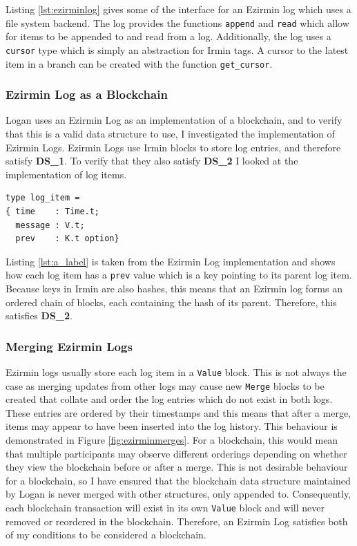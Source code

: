 \documentclass[12pt,a4paper,twoside,openright]{report}
\begin{document}
	Listing \ref{lst:ezirminlog} gives some of the interface for an Ezirmin log which uses a file system backend.
	The log provides the functions \texttt{append} and \texttt{read} which allow for items to be appended to and read from a log.
	Additionally, the log uses a \texttt{cursor} type which is simply an abstraction for Irmin tags.
	A cursor to the latest item in a branch can be created with the function \texttt{get\_cursor}.

	\subsubsection*{Ezirmin Log as a Blockchain}
	Logan uses an Ezirmin Log as an implementation of a blockchain, and to verify that this is a valid data structure to use, I investigated the implementation of Ezirmin Logs.
	Ezirmin Logs use Irmin blocks to store log entries, and therefore satisfy \textbf{DS\_1}. 
	To verify that they also satisfy \textbf{DS\_2} I looked at the implementation of log items.\\

	\begin{lstlisting}[caption={Ezirmin Log Item},label={lst:a_label}]
type log_item =
{ time    : Time.t;
  message : V.t;
  prev    : K.t option}
	\end{lstlisting}

	Listing \ref{lst:a_label} is taken from the Ezirmin Log implementation and shows how each log item has a \texttt{prev} value which is a key pointing to its parent log item. 
	Because keys in Irmin are also hashes, this means that an Ezirmin log forms an ordered chain of blocks, each containing the hash of its parent. 
	Therefore, this satisfies \textbf{DS\_2}.

	\subsubsection*{Merging Ezirmin Logs}
	Ezirmin logs usually store each log item in a \texttt{Value} block.
	This is not always the case as merging updates from other logs may cause new \texttt{Merge} blocks to be created that collate and order the log entries which do not exist in both logs.
	These entries are ordered by their timestamps and this means that after a merge, items may appear to have been inserted into the log history.
	This behaviour is demonstrated in Figure \ref{fig:ezirminmerges}.
	For a blockchain, this would mean that multiple participants may observe different orderings depending on whether they view the blockchain before or after a merge.
	This is not desirable behaviour for a blockchain, so I have ensured that the blockchain data structure maintained by Logan is never merged with other structures, only appended to. 
	Consequently, each blockchain transaction will exist in its own \texttt{Value} block and will never removed or reordered in the blockchain.
	Therefore, an Ezirmin Log satisfies both of my conditions to be considered a blockchain.\\
\end{document}
